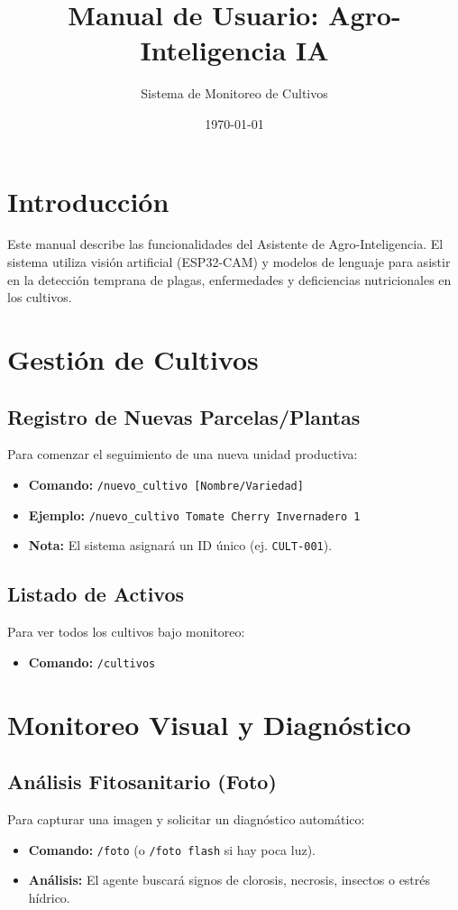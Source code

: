\documentclass[a4paper,12pt]{article}
\title{\textbf{Manual de Usuario: Agro-Inteligencia IA}}
\author{Sistema de Monitoreo de Cultivos}
\date{\today}
\begin{document}
\maketitle
\tableofcontents
\newpage

\section{Introducción}
Este manual describe las funcionalidades del Asistente de Agro-Inteligencia. El sistema utiliza visión artificial (ESP32-CAM) y modelos de lenguaje para asistir en la detección temprana de plagas, enfermedades y deficiencias nutricionales en los cultivos.

\section{Gestión de Cultivos}

\subsection{Registro de Nuevas Parcelas/Plantas}
Para comenzar el seguimiento de una nueva unidad productiva:
\begin{itemize}
    \item \textbf{Comando:} \texttt{/nuevo\_cultivo [Nombre/Variedad]}
    \item \textbf{Ejemplo:} \texttt{/nuevo\_cultivo Tomate Cherry Invernadero 1}
    \item \textbf{Nota:} El sistema asignará un ID único (ej. \texttt{CULT-001}).
\end{itemize}

\subsection{Listado de Activos}
Para ver todos los cultivos bajo monitoreo:
\begin{itemize}
    \item \textbf{Comando:} \texttt{/cultivos}
\end{itemize}

\section{Monitoreo Visual y Diagnóstico}

\subsection{Análisis Fitosanitario (Foto)}
Para capturar una imagen y solicitar un diagnóstico automático:
\begin{itemize}
    \item \textbf{Comando:} \texttt{/foto} (o \texttt{/foto flash} si hay poca luz).
    \item \textbf{Análisis:} El agente buscará signos de clorosis, necrosis, insectos o estrés hídrico.
\end{itemize}
\end{document}
